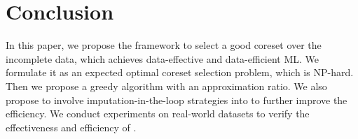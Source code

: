\section{Conclusion}

In this paper, we propose the \ours framework to select a good coreset over the incomplete data, which achieves data-effective and data-efficient ML. We formulate it as an expected optimal coreset selection problem, which is NP-hard. Then we propose a greedy algorithm with an approximation ratio. We also propose to involve imputation-in-the-loop strategies into \ours to further improve the efficiency. We conduct experiments on real-world datasets to verify the effectiveness and efficiency of \ours.
